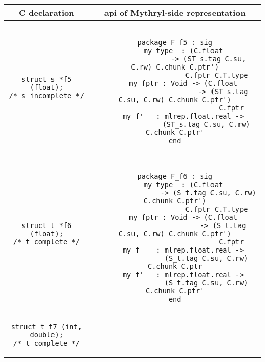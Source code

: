 \begin{small}
\begin{center}
\begin{tabular}{c|c}
C declaration & api of Mythryl-side representation \\ \hline\hline
\begin{minipage}{2in}
\begin{verbatim}
struct s *f5 (float);
/* s incomplete */
\end{verbatim}
\end{minipage}
&
\begin{minipage}{4in}
\begin{verbatim}

package F_f5 : sig
    my type  : (C.float
                -> (ST_s.tag C.su, C.rw) C.chunk C.ptr')
                    C.fptr C.T.type
    my fptr : Void -> (C.float
                       -> (ST_s.tag C.su, C.rw) C.chunk C.ptr')
                           C.fptr
    my f'   : mlrep.float.real ->
               (ST_s.tag C.su, C.rw) C.chunk C.ptr'
end

\end{verbatim}
\end{minipage}
\\ \hline
\begin{minipage}{2in}
\begin{verbatim}
struct t *f6 (float);
/* t complete */
\end{verbatim}
\end{minipage}
&
\begin{minipage}{4in}
\begin{verbatim}

package F_f6 : sig
    my type  : (C.float
                -> (S_t.tag C.su, C.rw) C.chunk C.ptr')
                    C.fptr C.T.type
    my fptr : Void -> (C.float
                       -> (S_t.tag C.su, C.rw) C.chunk C.ptr')
                           C.fptr
    my f    : mlrep.float.real ->
               (S_t.tag C.su, C.rw) C.chunk C.ptr
    my f'   : mlrep.float.real ->
               (S_t.tag C.su, C.rw) C.chunk C.ptr'
end

\end{verbatim}
\end{minipage}
\\ \hline
\begin{minipage}{2in}
\begin{verbatim}
struct t f7 (int, double);
/* t complete */
\end{verbatim}
\end{minipage}
&
\begin{minipage}{4in}
\begin{verbatim}


\end{verbatim}
\end{minipage}
\end{tabular}
\end{center}
\end{small}
